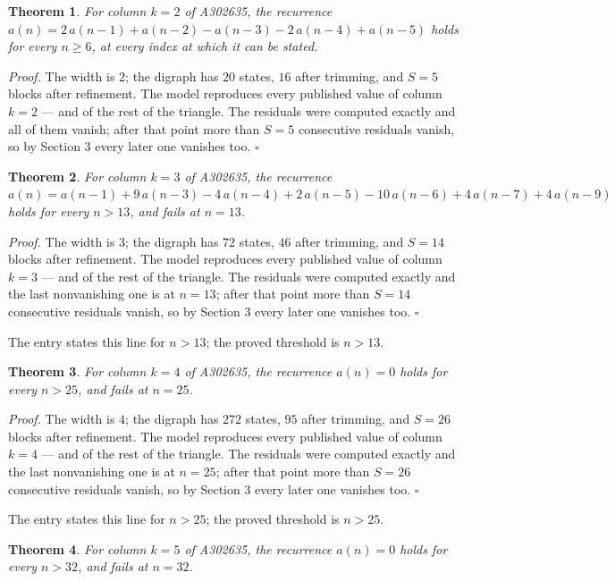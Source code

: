 \documentclass[11pt]{article}
\newtheorem{theorem}{Theorem}
\theoremstyle{definition}
\begin{document}
\begin{theorem} For column $k = 2$ of A302635, the recurrence $a(n) = 2\,a(n-1) + a(n-2) - a(n-3) - 2\,a(n-4) + a(n-5)$ holds for every $n \ge 6$, at every index at which it can be stated.\end{theorem}

{\itshape Proof.} The width is $2$; the digraph has $20$ states, $16$ after trimming, and $S = 5$ blocks after refinement. The model reproduces every published value of column $k = 2$ --- and of the rest of the triangle. The residuals were computed exactly and all of them vanish; after that point more than $S = 5$ consecutive residuals vanish, so by Section 3 every later one vanishes too. $\square$

\begin{theorem} For column $k = 3$ of A302635, the recurrence $a(n) = a(n-1) + 9\,a(n-3) - 4\,a(n-4) + 2\,a(n-5) - 10\,a(n-6) + 4\,a(n-7) + 4\,a(n-9)$ holds for every $n > 13$, and fails at $n = 13$.\end{theorem}

{\itshape Proof.} The width is $3$; the digraph has $72$ states, $46$ after trimming, and $S = 14$ blocks after refinement. The model reproduces every published value of column $k = 3$ --- and of the rest of the triangle. The residuals were computed exactly and the last nonvanishing one is at $n = 13$; after that point more than $S = 14$ consecutive residuals vanish, so by Section 3 every later one vanishes too. $\square$

The entry states this line for $n > 13$; the proved threshold is $n > 13$.

\begin{theorem} For column $k = 4$ of A302635, the recurrence $a(n) = 0$ holds for every $n > 25$, and fails at $n = 25$.\end{theorem}

{\itshape Proof.} The width is $4$; the digraph has $272$ states, $95$ after trimming, and $S = 26$ blocks after refinement. The model reproduces every published value of column $k = 4$ --- and of the rest of the triangle. The residuals were computed exactly and the last nonvanishing one is at $n = 25$; after that point more than $S = 26$ consecutive residuals vanish, so by Section 3 every later one vanishes too. $\square$

The entry states this line for $n > 25$; the proved threshold is $n > 25$.

\begin{theorem} For column $k = 5$ of A302635, the recurrence $a(n) = 0$ holds for every $n > 32$, and fails at $n = 32$.\end{theorem}
\end{document}
